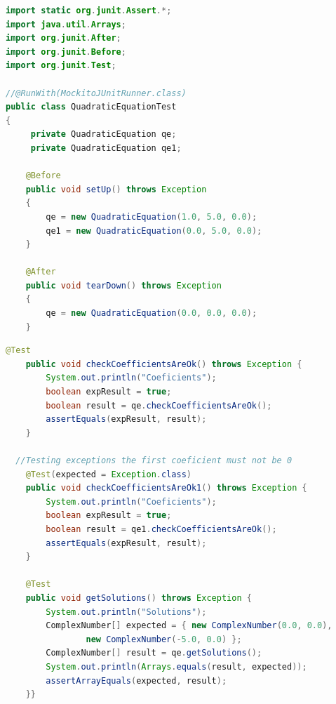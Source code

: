 \documentclass[11pt, xcolor=svgnames]{beamer}
\begin{document}




\begin{frame}[fragile]
\begin{lstlisting}[language=JAVA,basicstyle=\tiny]
import static org.junit.Assert.*;
import java.util.Arrays;
import org.junit.After;
import org.junit.Before;
import org.junit.Test;

//@RunWith(MockitoJUnitRunner.class)
public class QuadraticEquationTest
{
	 private QuadraticEquation qe;
	 private QuadraticEquation qe1;
	
	@Before
	public void setUp() throws Exception
	{
		qe = new QuadraticEquation(1.0, 5.0, 0.0);
		qe1 = new QuadraticEquation(0.0, 5.0, 0.0);
	}

	@After
	public void tearDown() throws Exception
	{
		qe = new QuadraticEquation(0.0, 0.0, 0.0);
	}
\end{lstlisting}
\end{frame}


\begin{frame}[fragile]
\begin{lstlisting}[language=JAVA,basicstyle=\tiny]
	@Test
	public void checkCoefficientsAreOk() throws Exception {
		System.out.println("Coeficients");
		boolean expResult = true;
		boolean result = qe.checkCoefficientsAreOk();
		assertEquals(expResult, result);
	}

  //Testing exceptions the first coeficient must not be 0
	@Test(expected = Exception.class) 
	public void checkCoefficientsAreOk1() throws Exception {
		System.out.println("Coeficients");
		boolean expResult = true;
		boolean result = qe1.checkCoefficientsAreOk();
		assertEquals(expResult, result);
	}
	
	@Test
	public void getSolutions() throws Exception {
		System.out.println("Solutions");
		ComplexNumber[] expected = { new ComplexNumber(0.0, 0.0),
				new ComplexNumber(-5.0, 0.0) };
		ComplexNumber[] result = qe.getSolutions();
		System.out.println(Arrays.equals(result, expected));
		assertArrayEquals(expected, result);
	}}
\end{lstlisting}
\end{frame}
\end{document}

